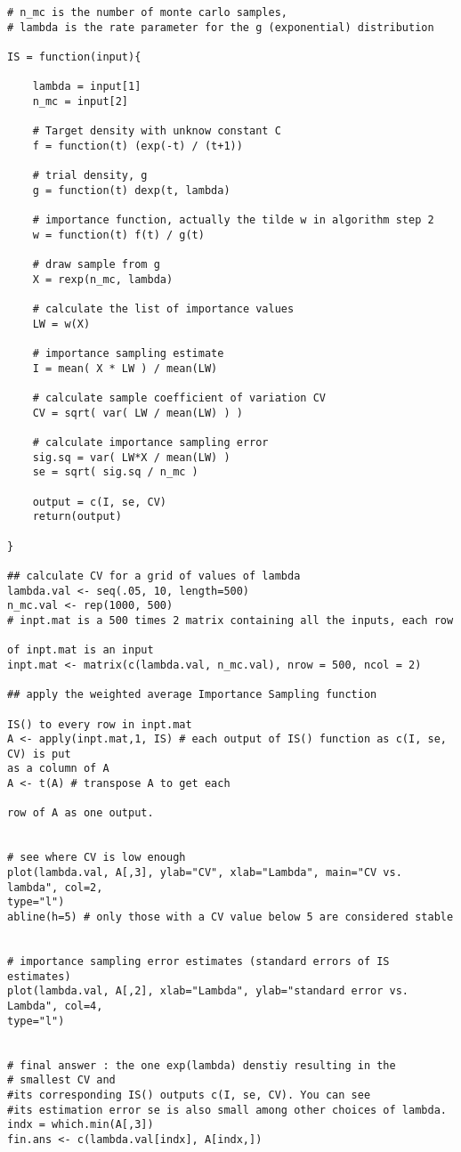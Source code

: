 \documentclass[12pt]{article}
\numberwithin{equation}{subsection}
\begin{document}
\begin{verbatim}
# n_mc is the number of monte carlo samples,
# lambda is the rate parameter for the g (exponential) distribution

IS = function(input){

	lambda = input[1]
	n_mc = input[2]
	
	# Target density with unknow constant C
	f = function(t) (exp(-t) / (t+1))
	
	# trial density, g
	g = function(t) dexp(t, lambda)
	
	# importance function, actually the tilde w in algorithm step 2
	w = function(t) f(t) / g(t)
	
	# draw sample from g
	X = rexp(n_mc, lambda)
	
	# calculate the list of importance values
	LW = w(X)
	
	# importance sampling estimate
	I = mean( X * LW ) / mean(LW)
	
	# calculate sample coefficient of variation CV
	CV = sqrt( var( LW / mean(LW) ) )
	
	# calculate importance sampling error
	sig.sq = var( LW*X / mean(LW) )
	se = sqrt( sig.sq / n_mc )
	
	output = c(I, se, CV)
	return(output)

}

## calculate CV for a grid of values of lambda
lambda.val <- seq(.05, 10, length=500)
n_mc.val <- rep(1000, 500)
# inpt.mat is a 500 times 2 matrix containing all the inputs, each row 

of inpt.mat is an input
inpt.mat <- matrix(c(lambda.val, n_mc.val), nrow = 500, ncol = 2)

## apply the weighted average Importance Sampling function 

IS() to every row in inpt.mat
A <- apply(inpt.mat,1, IS) # each output of IS() function as c(I, se, CV) is put 
as a column of A
A <- t(A) # transpose A to get each 

row of A as one output.


# see where CV is low enough
plot(lambda.val, A[,3], ylab="CV", xlab="Lambda", main="CV vs. lambda", col=2, 
type="l")
abline(h=5) # only those with a CV value below 5 are considered stable


# importance sampling error estimates (standard errors of IS estimates)
plot(lambda.val, A[,2], xlab="Lambda", ylab="standard error vs. Lambda", col=4, 
type="l")


# final answer : the one exp(lambda) denstiy resulting in the 
# smallest CV and 
#its corresponding IS() outputs c(I, se, CV). You can see 
#its estimation error se is also small among other choices of lambda.
indx = which.min(A[,3])
fin.ans <- c(lambda.val[indx], A[indx,])

\end{verbatim}
\end{document}
